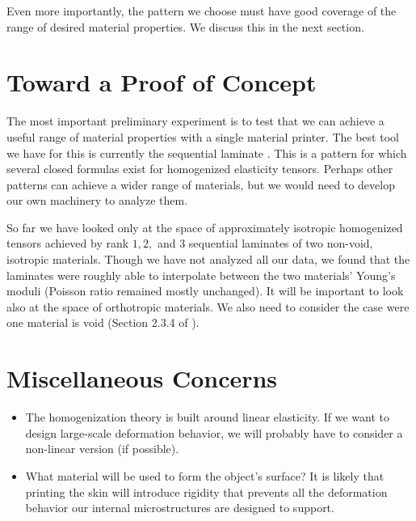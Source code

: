 \documentclass[10pt]{article}
\begin{document}
Even more importantly, the pattern we choose must have good coverage of the
range of desired material properties. We discuss this in the next section.

\section{Toward a Proof of Concept}
The most important preliminary experiment is to test that we
can achieve a useful range of material properties with a single material
printer. The best tool we have for this is currently the sequential laminate
\cite{allaire2002shape}. This is a pattern for which several closed formulas
exist for homogenized elasticity tensors. Perhaps other patterns can achieve a
wider range of materials, but we would need to develop our own machinery to
analyze them.

So far we have looked only at the space of approximately isotropic homogenized
tensors achieved by rank $1, 2, $ and $3$ sequential laminates of two
non-void, isotropic materials. Though we have not analyzed all our data, we
found that the laminates were roughly able to interpolate between the two
materials' Young's moduli (Poisson ratio remained mostly unchanged). It will be
important to look also at the space of orthotropic materials. We also need to
consider the case were one material is void (Section 2.3.4 of
\cite{allaire2002shape}).


\section{Miscellaneous Concerns}
\begin{itemize}
    \item The homogenization theory is built around linear elasticity. If we want to
        design large-scale deformation behavior, we will probably have to
        consider a non-linear version (if possible).

    \item What material will be used to form the object's surface? It is likely
        that printing the skin will introduce rigidity that prevents all the
        deformation behavior our internal microstructures are designed to
        support.
\end{itemize}






\end{document}
